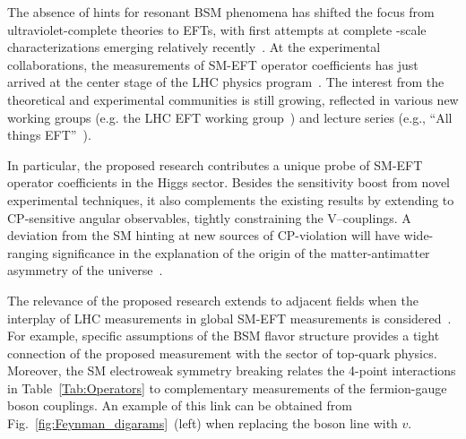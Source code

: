 \documentclass[a4paper,11pt]{article}
\renewcommand{\PV}{{{{V}}}\xspace}
\begin{document}
The absence of hints for resonant BSM phenomena has shifted the focus from ultraviolet-complete theories to EFTs, with first attempts at complete \TeV-scale characterizations emerging relatively recently~\cite{Ellis:2018gqa,Ellis:2020unq,Ethier:2021bye}.
At the experimental collaborations, the measurements of SM-EFT operator coefficients has just arrived at the center stage of the LHC physics program~\cite{CMS:2021nnc,CMS:2021aly,CMS:2021gme}.
The interest from the theoretical and experimental communities is still growing, reflected in various new working groups (e.g. the  LHC EFT working group~\cite{LHC_EFT_WG}) and lecture series (e.g., ``All things EFT''~\cite{All_EFT}).



In particular, the proposed research contributes a unique probe of SM-EFT operator coefficients in the Higgs sector.
Besides the sensitivity boost from novel experimental techniques, it also complements the existing results by extending to CP-sensitive angular observables, tightly constraining the \PV--\PH couplings.
A deviation from the SM hinting at new sources of CP-violation will have wide-ranging significance in the explanation of the origin of the matter-antimatter asymmetry of the universe~\cite{Cohen:1997ac,Damgaard:2015con,Grzadkowski:2018nbc}.



The relevance of the proposed research extends to adjacent fields when the interplay of LHC measurements in global SM-EFT measurements is considered~\cite{Ellis:2018gqa,Ethier:2021bye}.
For example, specific assumptions of the BSM flavor structure provides a tight connection of the proposed measurement with the sector of top-quark physics. 
Moreover, the SM electroweak symmetry breaking relates the 4-point interactions in Table~\ref{Tab:Operators} to complementary measurements of the fermion-gauge boson couplings. 
An example of this link can be obtained from Fig.~\ref{fig:Feynman_digarams}~(left) when replacing the \PH boson line with $v$.
\end{document}
